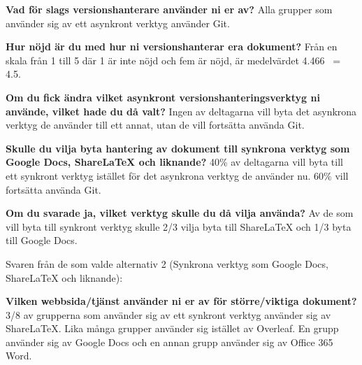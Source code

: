 \textbf{Vad för slags versionshanterare använder ni er av?}
Alla grupper som använder sig av ett asynkront verktyg använder Git.

\textbf{Hur nöjd är du med hur ni versionshanterar era dokument?}
Från en skala från 1 till 5 där 1 är inte nöjd och fem är nöjd, är medelvärdet 4.466 ~= 4.5.

\textbf{Om du fick ändra vilket asynkront versionshanteringsverktyg ni använde, vilket hade du då valt?}
Ingen av deltagarna vill byta det asynkrona verktyg de använder till ett annat, utan de vill fortsätta använda Git.

\textbf{Skulle du vilja byta hantering av dokument till synkrona verktyg som Google Docs, ShareLaTeX och liknande?}
40\% av deltagarna vill byta till ett synkront verktyg istället för det asynkrona verktyg de använder nu. 60\% vill fortsätta använda Git.

\textbf{Om du svarade ja, vilket verktyg skulle du då vilja använda?}
Av de som vill byta till synkront verktyg skulle 2/3 vilja byta till ShareLaTeX och 1/3 byta till Google Docs.


Svaren från de som valde alternativ 2 (Synkrona verktyg som Google Docs, ShareLaTeX och liknande):

\textbf{Vilken webbsida/tjänst använder ni er av för större/viktiga dokument?}
3/8 av grupperna som använder sig av ett synkront verktyg använder sig av ShareLaTeX. Lika många grupper använder sig istället av Overleaf. En grupp använder sig av Google Docs och en annan grupp använder sig av Office 365 Word. 


